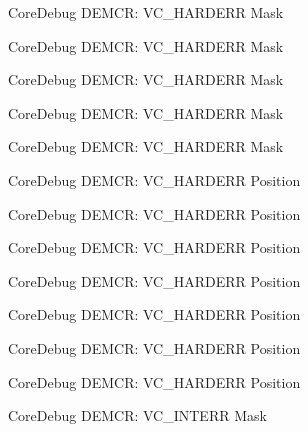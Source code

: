 \begin{DoxyRefList}
\label{deprecated__deprecated000200}%
%
Core\+Debug D\+E\+M\+CR\+: V\+C\+\_\+\+H\+A\+R\+D\+E\+RR Mask 

\label{deprecated__deprecated000275}%
%
Core\+Debug D\+E\+M\+CR\+: V\+C\+\_\+\+H\+A\+R\+D\+E\+RR Mask 

\label{deprecated__deprecated000342}%
%
Core\+Debug D\+E\+M\+CR\+: V\+C\+\_\+\+H\+A\+R\+D\+E\+RR Mask 

\label{deprecated__deprecated000418}%
%
Core\+Debug D\+E\+M\+CR\+: V\+C\+\_\+\+H\+A\+R\+D\+E\+RR Mask 

\label{deprecated__deprecated000507}%
%
Core\+Debug D\+E\+M\+CR\+: V\+C\+\_\+\+H\+A\+R\+D\+E\+RR Mask  
\item[Member \mbox{\hyperlink{group__CMSIS__CoreDebug_gaed9f42053031a9a30cd8054623304c0a}{Core\+Debug\+\_\+\+D\+E\+M\+C\+R\+\_\+\+V\+C\+\_\+\+H\+A\+R\+D\+E\+R\+R\+\_\+\+Pos}} ]\label{deprecated__deprecated000055}%
%
Core\+Debug D\+E\+M\+CR\+: V\+C\+\_\+\+H\+A\+R\+D\+E\+RR Position 

\label{deprecated__deprecated000135}%
%
Core\+Debug D\+E\+M\+CR\+: V\+C\+\_\+\+H\+A\+R\+D\+E\+RR Position 

\label{deprecated__deprecated000199}%
%
Core\+Debug D\+E\+M\+CR\+: V\+C\+\_\+\+H\+A\+R\+D\+E\+RR Position 

\label{deprecated__deprecated000274}%
%
Core\+Debug D\+E\+M\+CR\+: V\+C\+\_\+\+H\+A\+R\+D\+E\+RR Position 

\label{deprecated__deprecated000341}%
%
Core\+Debug D\+E\+M\+CR\+: V\+C\+\_\+\+H\+A\+R\+D\+E\+RR Position 

\label{deprecated__deprecated000417}%
%
Core\+Debug D\+E\+M\+CR\+: V\+C\+\_\+\+H\+A\+R\+D\+E\+RR Position 

\label{deprecated__deprecated000506}%
%
Core\+Debug D\+E\+M\+CR\+: V\+C\+\_\+\+H\+A\+R\+D\+E\+RR Position  
\item[Member \mbox{\hyperlink{group__CMSIS__CoreDebug_gad6815d8e3df302d2f0ff2c2c734ed29a}{Core\+Debug\+\_\+\+D\+E\+M\+C\+R\+\_\+\+V\+C\+\_\+\+I\+N\+T\+E\+R\+R\+\_\+\+Msk}} ]\label{deprecated__deprecated000058}%
%
Core\+Debug D\+E\+M\+CR\+: V\+C\+\_\+\+I\+N\+T\+E\+RR Mask 


\end{DoxyRefList}
